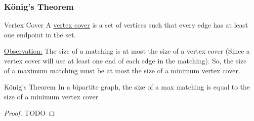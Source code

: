 \subsubsection{K\"{o}nig's Theorem}
\begin{definition}{Vertex Cover}{}
    A \underline{vertex cover} is a set of vertices such that every edge has at least one endpoint in the set.
\end{definition}
\underline{Observation:} The size of a matching is at most the size of a vertex cover (Since a vertex cover will use at least one end of each edge in the matching). So, the size of a maximum matching must be at most the size of a minimum vertex cover.
\begin{theorem}{K\"{o}nig's Theorem}{}
    In a bipartite graph, the size of a max matching is equal to the size of a minimum vertex cover
\end{theorem}
\begin{proof}
    TODO
\end{proof}

